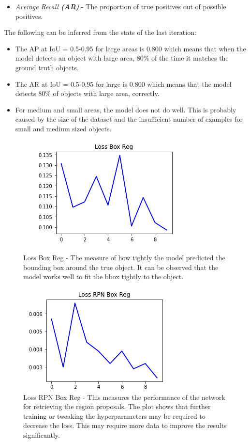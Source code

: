 \documentclass[12pt, landscape]{article}
\begin{document}
\begin{multicols}{3}
\begin{itemize}
    \item \emph{Average Recall \textbf{(AR)}} - The proportion of true positives
    out of possible positives.
\end{itemize}

The following can be inferred from the stats of the last iteration:
\begin{itemize}
    \item The AP at IoU = 0.5-0.95 for large areas is 0.800 which means that when
    the model detects an object with large area, 80\% of the time it matches the
    ground truth objects.

    \item The AR  at IoU = 0.5-0.95 for large is 0.800 which means that the
    model detects 80\% of objects with large area, correctly.

    \item For medium and small areas, the model does not do well. This is
    probably caused by the size of the dataset and the insufficient number of
    examples for small and medium sized objects.
\end{itemize}

\begin{figure}[H]
    \centerline{\includegraphics[scale = 0.6]{lossboxreg.png}}
    \caption{Loss Box Reg - The measure of how tightly the model predicted the bounding box around the true object. It can be observed that the model works well to fit the bbox tightly to the object.}
    \label{fig:LosBoxReg}
\end{figure}

\begin{figure}[H]
    \centerline{\includegraphics[scale = 0.6]{lossrpnboxreg.png}}
    \caption{Loss RPN Box Reg - This measures the performance of the network for retrieving the region proposals. The plot shows that further training or tweaking the hyperparameters may be required to decrease the loss. This may require more data to improve the results significantly.}
    \label{fig:LossRPNBoxReg}
\end{figure}


\end{multicols}
\end{document}
